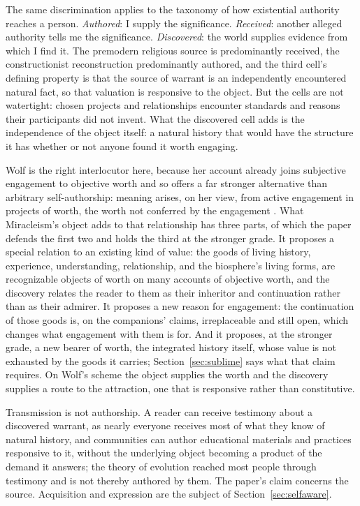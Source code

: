 The same discrimination applies to the taxonomy of how existential authority
reaches a person. \emph{Authored}: I supply the significance.
\emph{Received}: another alleged authority tells me the significance.
\emph{Discovered}: the world supplies evidence from which I find it. The
premodern religious source is predominantly received, the constructionist
reconstruction predominantly authored, and the third cell's defining property
is that the source of warrant is an independently encountered natural fact,
so that valuation is responsive to the object. But the cells are not
watertight: chosen projects and relationships encounter standards and reasons
their participants did not invent. What the discovered cell adds is the independence of the object
itself: a natural history that would have the structure it has whether or not
anyone found it worth engaging.

Wolf is the right interlocutor here, because her account already joins
subjective engagement to objective worth and so offers a far stronger
alternative than arbitrary self-authorship: meaning arises, on her view, from
active engagement in projects of worth, the worth not conferred by the
engagement \cite{Wolf10}. What Miracleism's object adds to that relationship
has three parts, of which the paper defends the first two and holds the third
at the stronger grade. It proposes
a special relation to an existing kind of value: the goods of living history,
experience, understanding, relationship, and the biosphere's living forms, are
recognizable objects of worth on many accounts of objective worth, and
the discovery relates the reader to them as their inheritor and continuation
rather than as their admirer. It proposes a new reason for engagement: the
continuation of those goods is, on the companions' claims, irreplaceable and
still open, which changes what engagement with them is for. And it proposes,
at the stronger grade, a new bearer of worth, the integrated history itself,
whose value is not exhausted by the goods it carries; Section~\ref{sec:sublime}
says what that claim requires. On Wolf's scheme the object supplies the worth
and the discovery supplies a route to the attraction, one that is responsive
rather than constitutive.

Transmission is not authorship. A reader can receive testimony about a
discovered warrant, as nearly everyone receives most of what they know of
natural history, and communities can author educational materials and
practices responsive to it, without the underlying object becoming a product
of the demand it answers; the theory of evolution reached most people through
testimony and is not thereby authored by them. The paper's claim concerns the
source. Acquisition and expression are the subject of
Section~\ref{sec:selfaware}.

